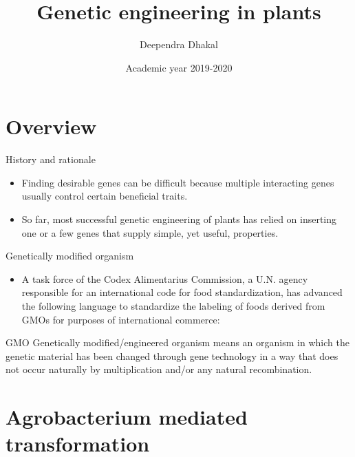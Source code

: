 \documentclass[ignorenonframetext,aspectratio=169]{beamer}
\title{Genetic engineering in plants}
\author{Deependra Dhakal}
\institute{GAASC, Baitadi \and Tribhuwan University}
\date{Academic year 2019-2020}
\providecommand{\tightlist}{%
  \setlength{\itemsep}{0pt}\setlength{\parskip}{0pt}}
\begin{document}
\frame{\titlepage}

\begin{frame}
\tableofcontents[hideallsubsections]
\end{frame}
\hypertarget{overview}{%
\section{Overview}\label{overview}}

\begin{frame}{History and rationale}
\protect\hypertarget{history-and-rationale}{}

\begin{itemize}
\tightlist
\item
  Finding desirable genes can be difficult because multiple interacting
  genes usually control certain beneficial traits.
\item
  So far, most successful genetic engineering of plants has relied on
  inserting one or a few genes that supply simple, yet useful,
  properties.
\end{itemize}

\end{frame}

\begin{frame}{Genetically modified organism}
\protect\hypertarget{genetically-modified-organism}{}

\begin{itemize}
\tightlist
\item
  A task force of the Codex Alimentarius Commission, a U.N. agency
  responsible for an international code for food standardization, has
  advanced the following language to standardize the labeling of foods
  derived from GMOs for purposes of international commerce:
\end{itemize}

\begin{block}{GMO}
Genetically modified/engineered organism means an organism in which the genetic material has been changed through gene technology in a way that does not occur naturally by multiplication and/or any natural recombination.
\end{block}

\end{frame}

\hypertarget{agrobacterium-mediated-transformation}{%
\section{Agrobacterium mediated
transformation}\label{agrobacterium-mediated-transformation}}
\end{document}
